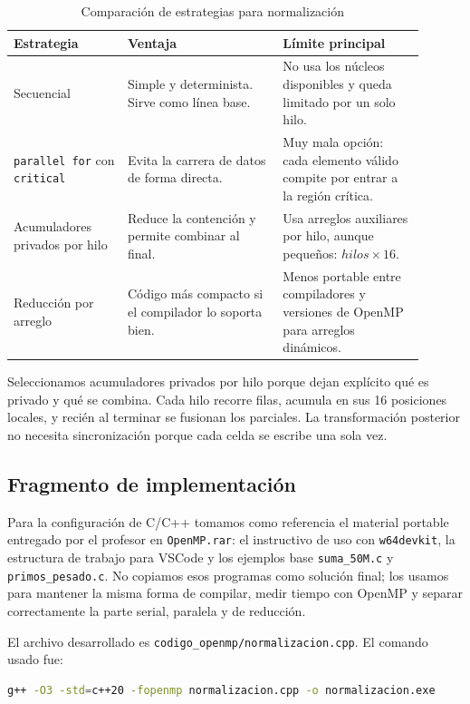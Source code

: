 \documentclass[letterpaper,11pt]{article}
\begin{document}
\begin{table}[H]
\centering
\caption{Comparación de estrategias para normalización}
\begin{tabular}{p{0.25\linewidth} p{0.34\linewidth} p{0.31\linewidth}}
\toprule
Estrategia & Ventaja & Límite principal \\
\midrule
Secuencial & Simple y determinista. Sirve como línea base. & No usa los núcleos disponibles y queda limitado por un solo hilo. \\
\texttt{parallel for} con \texttt{critical} & Evita la carrera de datos de forma directa. & Muy mala opción: cada elemento válido compite por entrar a la región crítica. \\
Acumuladores privados por hilo & Reduce la contención y permite combinar al final. & Usa arreglos auxiliares por hilo, aunque pequeños: \(hilos \times 16\). \\
Reducción por arreglo & Código más compacto si el compilador lo soporta bien. & Menos portable entre compiladores y versiones de OpenMP para arreglos dinámicos. \\
\bottomrule
\end{tabular}
\end{table}

Seleccionamos acumuladores privados por hilo porque dejan explícito qué es privado y qué se combina. Cada hilo recorre filas, acumula en sus 16 posiciones locales, y recién al terminar se fusionan los parciales. La transformación posterior no necesita sincronización porque cada celda se escribe una sola vez.

\subsection{Fragmento de implementación}

Para la configuración de C/C++ tomamos como referencia el material portable entregado por el profesor en \texttt{OpenMP.rar}: el instructivo de uso con \texttt{w64devkit}, la estructura de trabajo para VSCode y los ejemplos base \texttt{suma\_50M.c} y \texttt{primos\_pesado.c}. No copiamos esos programas como solución final; los usamos para mantener la misma forma de compilar, medir tiempo con OpenMP y separar correctamente la parte serial, paralela y de reducción.

El archivo desarrollado es \texttt{codigo\_openmp/normalizacion.cpp}. El comando usado fue:

\begin{lstlisting}[language=bash]
g++ -O3 -std=c++20 -fopenmp normalizacion.cpp -o normalizacion.exe
\end{lstlisting}
\end{document}
